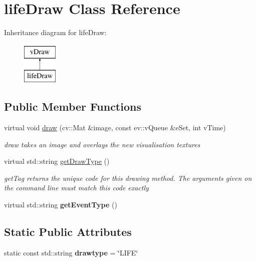 \hypertarget{classlifeDraw}{}\section{life\+Draw Class Reference}
\label{classlifeDraw}
Inheritance diagram for life\+Draw\+:\begin{figure}[H]
\begin{center}
\leavevmode
\includegraphics[height=2.000000cm]{classlifeDraw}
\end{center}
\end{figure}
\subsection*{Public Member Functions}
\begin{DoxyCompactItemize}
\item 
virtual void \hyperlink{classlifeDraw_af24592ae0bc8be55c7871e17adf6d77b}{draw} (cv\+::\+Mat \&image, const ev\+::v\+Queue \&e\+Set, int v\+Time)
\begin{DoxyCompactList}\small\item\em draw takes an image and overlays the new visualisation textures \end{DoxyCompactList}\item 
virtual std\+::string \hyperlink{classlifeDraw_a347b92eed9cd308902eecd3346eef5d4}{get\+Draw\+Type} ()
\begin{DoxyCompactList}\small\item\em get\+Tag returns the unique code for this drawing method. The arguments given on the command line must match this code exactly \end{DoxyCompactList}\item 
virtual std\+::string {\bfseries get\+Event\+Type} ()\hypertarget{classlifeDraw_a26a99ed97931f1c574f1366a9cbb848d}{}\label{classlifeDraw_a26a99ed97931f1c574f1366a9cbb848d}

\end{DoxyCompactItemize}
\subsection*{Static Public Attributes}
\begin{DoxyCompactItemize}
\item 
static const std\+::string {\bfseries drawtype} = \char`\"{}L\+I\+FE\char`\"{}\hypertarget{classlifeDraw_aac0bcaef3dd9be45ba6fe9df956f9b07}{}\label{classlifeDraw_aac0bcaef3dd9be45ba6fe9df956f9b07}

\end{DoxyCompactItemize}

